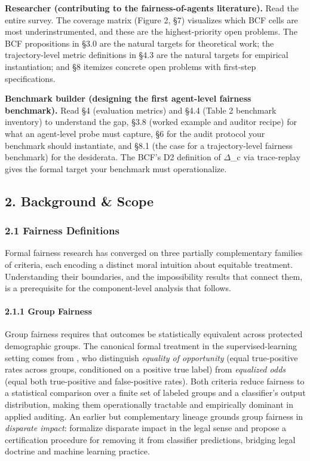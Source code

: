 \documentclass[10pt]{article}
\begin{document}
\textbf{Researcher (contributing to the fairness-of-agents literature).} Read the entire survey. The coverage matrix (Figure 2, \S{}7) visualizes which BCF cells are most underinstrumented, and these are the highest-priority open problems. The BCF propositions in \S{}3.0 are the natural targets for theoretical work; the trajectory-level metric definitions in \S{}4.3 are the natural targets for empirical instantiation; and \S{}8 itemizes concrete open problems with first-step specifications.

\textbf{Benchmark builder (designing the first agent-level fairness benchmark).} Read \S{}4 (evaluation metrics) and \S{}4.4 (Table 2 benchmark inventory) to understand the gap, \S{}3.8 (worked example and auditor recipe) for what an agent-level probe must capture, \S{}6 for the audit protocol your benchmark should instantiate, and \S{}8.1 (the case for a trajectory-level fairness benchmark) for the desiderata. The BCF's D2 definition of $\Delta$\_c via trace-replay gives the formal target your benchmark must operationalize.



\subsection*{2. Background \& Scope}

\subsubsection*{2.1 Fairness Definitions}

Formal fairness research has converged on three partially complementary families of criteria, each encoding a distinct moral intuition about equitable treatment. Understanding their boundaries, and the impossibility results that connect them, is a prerequisite for the component-level analysis that follows.

\paragraph*{2.1.1 Group Fairness}

Group fairness requires that outcomes be statistically equivalent across protected demographic groups. The canonical formal treatment in the supervised-learning setting comes from \cite{hardt2016equality}, who distinguish \emph{equality of opportunity} (equal true-positive rates across groups, conditioned on a positive true label) from \emph{equalized odds} (equal both true-positive and false-positive rates). Both criteria reduce fairness to a statistical comparison over a finite set of labeled groups and a classifier's output distribution, making them operationally tractable and empirically dominant in applied auditing. An earlier but complementary lineage grounds group fairness in \emph{disparate impact}: \cite{feldman2015certifying} formalize disparate impact in the legal sense and propose a certification procedure for removing it from classifier predictions, bridging legal doctrine and machine learning practice.
\end{document}
